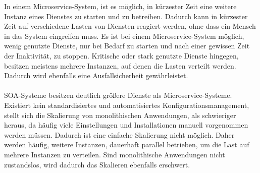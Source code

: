 In einem Microservice-System, ist es möglich, in kürzester Zeit eine weitere Instanz eines Dienstes zu starten und zu betreiben. Dadurch kann in kürzester Zeit auf verschiedene Lasten von Diensten reagiert werden, ohne dass ein Mensch in das System eingreifen muss. Es ist bei einem Microservice-System möglich, wenig genutzte Dienste, nur bei Bedarf zu starten und nach einer gewissen Zeit der Inaktivität, zu stoppen. Kritische oder stark genutzte Dienste hingegen, besitzen meistens mehrere Instanzen, auf denen die Lasten verteilt werden. Dadurch wird ebenfalls eine Ausfallsicherheit gewährleistet.
\\\\
SOA-Systeme besitzen deutlich größere Dienste als Microservice-Systeme. Existiert kein standardisiertes und automatisiertes Konfigurationsmanagement, stellt sich die Skalierung von monolithischen Anwendungen, als schwieriger heraus, da häufig viele Einstellungen und Installationen manuell vorgenommen werden müssen. Dadurch ist eine einfache Skalierung nicht möglich. Daher werden häufig, weitere Instanzen, dauerhaft parallel betrieben, um die Last auf mehrere Instanzen zu verteilen. Sind monolithische Anwendungen nicht zustandslos, wird dadurch das Skalieren ebenfalls erschwert.


